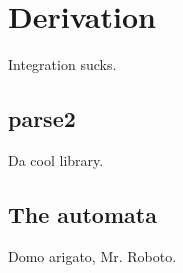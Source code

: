 \chapter{Derivation}

Integration sucks.

\section{parse2}

Da cool library.

\section{The automata}

Domo arigato, Mr. Roboto.